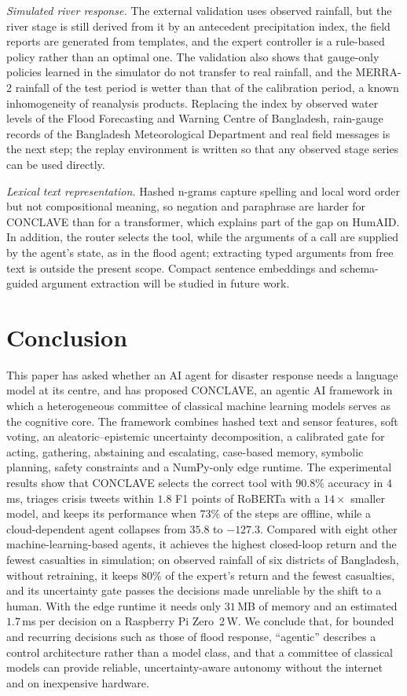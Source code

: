 \documentclass[journal]{IEEEtran}
\begin{document}
\textit{Simulated river response.} The external validation uses observed
rainfall, but the river stage is still derived from it by an antecedent
precipitation index, the field reports are generated from templates, and the
expert controller is a rule-based policy rather than an optimal one. The
validation also shows that gauge-only policies learned in the simulator do not
transfer to real rainfall, and the MERRA-2 rainfall of the test period is wetter
than that of the calibration period, a known inhomogeneity of reanalysis
products. Replacing the index by observed water levels of the Flood
Forecasting and Warning Centre of Bangladesh, rain-gauge records of the
Bangladesh Meteorological Department and real field messages is the next step;
the replay environment is written so that any observed stage series can be
used directly.

\textit{Lexical text representation.} Hashed n-grams capture spelling and
local word order but not compositional meaning, so negation and paraphrase
are harder for CONCLAVE than for a transformer, which explains part of the gap
on HumAID. In addition, the router selects the tool, while the arguments of a
call are supplied by the agent's state, as in the flood agent; extracting typed
arguments from free text is outside the present scope. Compact sentence
embeddings and schema-guided argument extraction will be studied in future
work.

\section{Conclusion}\label{sec:conclusion}
This paper has asked whether an AI agent for disaster response needs a
language model at its centre, and has proposed CONCLAVE, an agentic AI
framework in which a heterogeneous committee of classical machine learning
models serves as the cognitive core. The framework combines hashed text and
sensor features, soft voting, an aleatoric--epistemic uncertainty
decomposition, a calibrated gate for acting, gathering, abstaining and
escalating, case-based memory, symbolic planning, safety constraints and a
NumPy-only edge runtime. The experimental results show that CONCLAVE selects
the correct tool with $90.8\%$ accuracy in $4$\,ms, triages crisis tweets within
$1.8$ F1 points of RoBERTa with a $14\times$ smaller model, and keeps its
performance when $73\%$ of the steps are offline, while a cloud-dependent agent
collapses from $35.8$ to $-127.3$. Compared with eight other
machine-learning-based agents, it achieves the highest closed-loop return and
the fewest casualties in simulation; on observed rainfall of six districts of
Bangladesh, without retraining, it keeps $80\%$ of the expert's return and the
fewest casualties, and its uncertainty gate passes the decisions made
unreliable by the shift to a human. With the edge runtime it needs only $31$\,MB of
memory and an estimated $1.7$\,ms per decision on a Raspberry Pi Zero~2\,W. We
conclude that, for bounded and recurring decisions such as those of flood
response, ``agentic'' describes a control architecture rather than a model
class, and that a committee of classical models can provide reliable,
uncertainty-aware autonomy without the internet and on inexpensive hardware.
\end{document}
